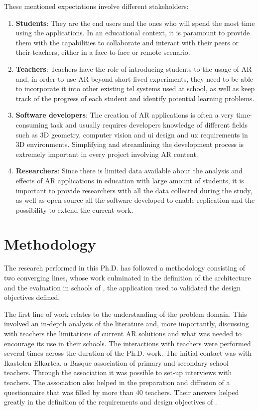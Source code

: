 These mentioned expectations involve different stakeholders: 
\begin{enumerate}
    \item \textbf{Students}: They are the end users and the ones who will spend the most time using the applications. In an educational context, it is paramount to provide them with the capabilities to collaborate and interact with their peers or their teachers, either in a face-to-face or remote scenario.
    \item \textbf{Teachers}: Teachers have the role of introducing students to the usage of AR and, in order to use AR beyond short-lived experiments, they need to be able to incorporate it into other existing \gls{tel} systems used at school, as well as keep track of the progress of each student and identify potential learning problems.
    \item \textbf{Software developers}: The creation of AR applications is often a very time-consuming task and usually requires developers knowledge of different fields such as 3D geometry, computer vision and \gls{ui} design and \gls{ux} requirements in 3D environments. Simplifying and streamlining the development process is extremely important in every project involving AR content.
    \item \textbf{Researchers}: Since there is limited data available about the analysis and effects of AR applications in education with large amount of students, it is important to provide researchers with all the data collected during the study, as well as open source all the software developed to enable replication and the possibility to extend the current work.
\end{enumerate}

\section{Methodology}\label{sec:methodology}
The research performed in this Ph.D. has followed a methodology consisting of two converging lines, whose work culminated in the definition of the \arch{} architecture and the evaluation in schools of \appname{}, the application used to validated the design objectives defined.

The first line of work relates to the understanding of the problem domain. This involved an in-depth analysis of the literature and, more importantly, discussing with teachers the limitations of current AR solutions and what was needed to encourage its use in their schools. The interactions with teachers were performed several times across the duration of the Ph.D. work. The initial contact was with Ikastolen Elkartea, a Basque association of primary and secondary school teachers. Through the association it was possible to set-up interviews with teachers. The association also helped in the preparation and diffusion of a questionnaire that was filled by more than 40 teachers. Their answers helped greatly in the definition of the requirements and design objectives of \arch.

